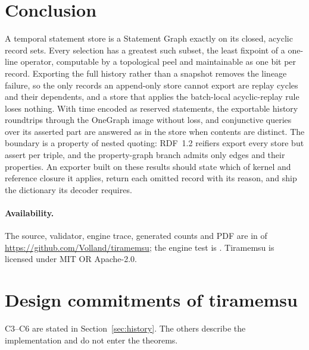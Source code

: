 \documentclass[11pt]{article}
\theoremstyle{plain}
\theoremstyle{definition}
\theoremstyle{remark}
\begin{document}
\section{Conclusion}
A temporal statement store is a Statement Graph exactly on its closed, acyclic
record sets. Every selection has a greatest such subset, the least fixpoint of a
one-line operator, computable by a topological peel and maintainable as one bit per
record. Exporting the full history rather than a snapshot removes the lineage
failure, so the only records an append-only store cannot export are replay cycles
and their dependents, and a store that applies the batch-local acyclic-replay rule
loses nothing. With time encoded as reserved statements, the exportable history
roundtrips through the OneGraph image without loss, and conjunctive queries over its
asserted part are answered as in the store when contents are distinct. The boundary
is a property of nested quoting: RDF~1.2 reifiers export every store but assert per
triple, and the property-graph branch admits only edges and their properties. An exporter built on these results should state which
of kernel and reference closure it applies, return each omitted record with its
reason, and ship the dictionary its decoder requires.

\paragraph{Availability.}
The source, validator, engine trace, generated counts and PDF are in
 of \url{https://github.com/Volland/tiramemsu};
the engine test is . Tiramemsu is
licensed under MIT OR Apache-2.0.

\appendix
\section{Design commitments of tiramemsu}\label{app:commitments}
C3--C6 are stated in Section~\ref{sec:history}. The others describe the
implementation and do not enter the theorems.
\end{document}
